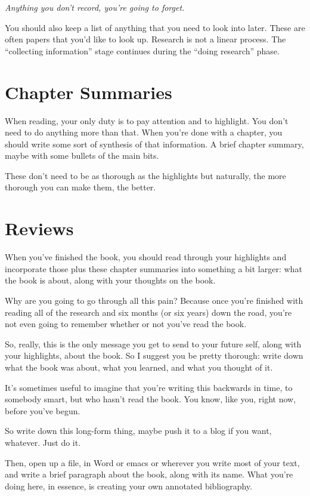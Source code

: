\textit{Anything you don't record, you're going to forget.}

You should also keep a list of anything that you need to look into later. These are
often papers that you'd like to look up. Research is not a linear process. The
``collecting information'' stage continues during the ``doing research'' phase.

\section{Chapter Summaries}

When reading, your only duty is to pay attention and to highlight. You don't
need to do anything more than that. When you're done with a chapter, you should
write some sort of synthesis of that information. A brief chapter summary, maybe
with some bullets of the main bits.

These don't need to be as thorough as the highlights but naturally, the more
thorough you can make them, the better.

\section{Reviews}

When you've finished the book, you should read through your highlights
and incorporate those plus these chapter
summaries into something a bit larger: what the book is about, along with your
thoughts on the book.

Why are you going to go through all this pain? Because once you're finished
with reading all of the research and six months (or six years) down the road,
you're not even going to remember whether or not you've read the book.

So, really, this is the only message you get to send to your future self, along
with your highlights, about the book. So I suggest you be pretty
thorough: write down what the book was about, what you learned, and what you
thought of it.

It's sometimes useful to imagine that you're writing this backwards in time, to
somebody smart, but who hasn't read the book. You know, like you, right now,
before you've begun.

So write down this long-form thing, maybe push it to a blog if you want,
whatever. Just do it.

Then, open up a file, in Word or emacs or wherever you write most of your text,
and write a brief paragraph about the book, along with its name. What you're
doing here, in essence, is creating your own annotated bibliography.

